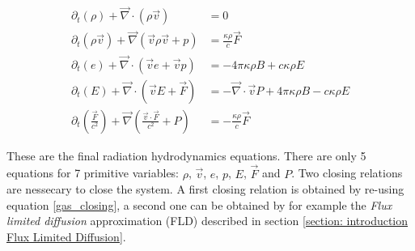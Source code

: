 \begin{align}
 \partial_t \left(\rho \right) + \vec{\nabla} \cdot \left( \rho \vec{v}  \right) &= 0 \label{eq: rhd_cont} \\
 \partial_t \left(\rho \vec{v} \right) + \vec{\nabla} \left( \vec{v} \rho \vec{v} + p \right) 
 &= \frac{\kappa \rho}{c} \vec{F} \label{eq: rhd_mom} \\
 \partial_t \left(e \right) + \vec{\nabla} \cdot \left( \vec{v} e + \vec{v} p \right) &= -4\pi \kappa\rho B + c \kappa \rho E \label{eq: rhd_e}\\
 \partial_t \left(E \right) +  \vec{\nabla} \cdot \left( \vec{v} E + \vec{F} \right) &=  -\vec{\nabla} \cdot \vec{v} P + 4\pi \kappa\rho B - c \kappa \rho E \label{eq: rhd_e_r} \\
 \partial_t \left(\frac{\vec{F}}{c^2} \right) +  \vec{\nabla} \left( \frac{\vec{v} \cdot \vec{F}}{c^2} + P \right) &= - \frac{\kappa \rho}{c} \vec{F} \label{eq: rhd_flux}
\end{align}

These are the final radiation hydrodynamics equations. There are only 5 equations for 7 primitive variables: $\rho$, $\vec{v}$, $e$, $p$, $E$, $\vec{F}$ and $P$. Two closing relations are nessecary to close the system. A first closing relation is obtained by re-using equation \eqref{gas_closing}, a second one can be obtained by for example the \emph{Flux limited diffusion} approximation (FLD) described in section \ref{section: introduction Flux Limited Diffusion}.


